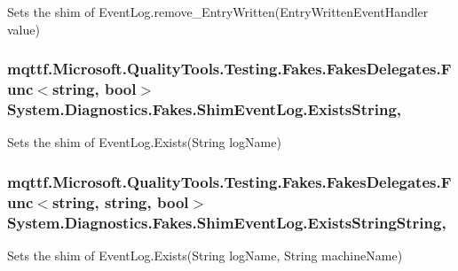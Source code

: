 Sets the shim of Event\-Log.\-remove\-\_\-\-Entry\-Written(\-Entry\-Written\-Event\-Handler value)

\hypertarget{class_system_1_1_diagnostics_1_1_fakes_1_1_shim_event_log_a8141d367efa1d9694abae020134b4f65}{
\subsubsection[{Exists\-String}]{\setlength{\rightskip}{0pt plus 5cm}mqttf.\-Microsoft.\-Quality\-Tools.\-Testing.\-Fakes.\-Fakes\-Delegates.\-Func$<$string, bool$>$ System.\-Diagnostics.\-Fakes.\-Shim\-Event\-Log.\-Exists\-String\hspace{0.3cm}{\ttfamily [static]}, {\ttfamily [set]}}}\label{class_system_1_1_diagnostics_1_1_fakes_1_1_shim_event_log_a8141d367efa1d9694abae020134b4f65}


Sets the shim of Event\-Log.\-Exists(\-String log\-Name)

\hypertarget{class_system_1_1_diagnostics_1_1_fakes_1_1_shim_event_log_ac5f53c2cd3b5d539cd52c31d25df0c86}{
\subsubsection[{Exists\-String\-String}]{\setlength{\rightskip}{0pt plus 5cm}mqttf.\-Microsoft.\-Quality\-Tools.\-Testing.\-Fakes.\-Fakes\-Delegates.\-Func$<$string, string, bool$>$ System.\-Diagnostics.\-Fakes.\-Shim\-Event\-Log.\-Exists\-String\-String\hspace{0.3cm}{\ttfamily [static]}, {\ttfamily [set]}}}\label{class_system_1_1_diagnostics_1_1_fakes_1_1_shim_event_log_ac5f53c2cd3b5d539cd52c31d25df0c86}


Sets the shim of Event\-Log.\-Exists(\-String log\-Name, String machine\-Name)

